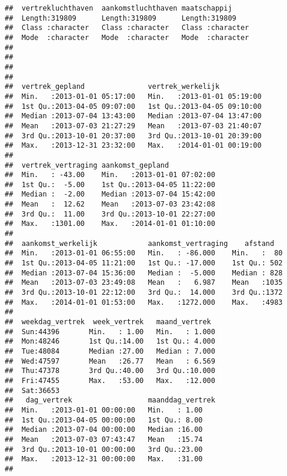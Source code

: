 \documentclass[]{memoir}
\begin{document}
\begin{verbatim}
##  vertrekluchthaven  aankomstluchthaven maatschappij      
##  Length:319809      Length:319809      Length:319809     
##  Class :character   Class :character   Class :character  
##  Mode  :character   Mode  :character   Mode  :character  
##                                                          
##                                                          
##                                                          
##                                                          
##  vertrek_gepland               vertrek_werkelijk            
##  Min.   :2013-01-01 05:17:00   Min.   :2013-01-01 05:19:00  
##  1st Qu.:2013-04-05 09:07:00   1st Qu.:2013-04-05 09:10:00  
##  Median :2013-07-04 13:43:00   Median :2013-07-04 13:47:00  
##  Mean   :2013-07-03 21:27:29   Mean   :2013-07-03 21:40:07  
##  3rd Qu.:2013-10-01 20:37:00   3rd Qu.:2013-10-01 20:39:00  
##  Max.   :2013-12-31 23:32:00   Max.   :2014-01-01 00:19:00  
##                                                             
##  vertrek_vertraging aankomst_gepland             
##  Min.   : -43.00    Min.   :2013-01-01 07:02:00  
##  1st Qu.:  -5.00    1st Qu.:2013-04-05 11:22:00  
##  Median :  -2.00    Median :2013-07-04 15:42:00  
##  Mean   :  12.62    Mean   :2013-07-03 23:42:08  
##  3rd Qu.:  11.00    3rd Qu.:2013-10-01 22:27:00  
##  Max.   :1301.00    Max.   :2014-01-01 01:10:00  
##                                                  
##  aankomst_werkelijk            aankomst_vertraging    afstand    
##  Min.   :2013-01-01 06:55:00   Min.   : -86.000    Min.   :  80  
##  1st Qu.:2013-04-05 11:21:00   1st Qu.: -17.000    1st Qu.: 502  
##  Median :2013-07-04 15:36:00   Median :  -5.000    Median : 828  
##  Mean   :2013-07-03 23:49:08   Mean   :   6.987    Mean   :1035  
##  3rd Qu.:2013-10-01 22:12:00   3rd Qu.:  14.000    3rd Qu.:1372  
##  Max.   :2014-01-01 01:53:00   Max.   :1272.000    Max.   :4983  
##                                                                  
##  weekdag_vertrek  week_vertrek   maand_vertrek   
##  Sun:44396       Min.   : 1.00   Min.   : 1.000  
##  Mon:48246       1st Qu.:14.00   1st Qu.: 4.000  
##  Tue:48084       Median :27.00   Median : 7.000  
##  Wed:47597       Mean   :26.77   Mean   : 6.569  
##  Thu:47378       3rd Qu.:40.00   3rd Qu.:10.000  
##  Fri:47455       Max.   :53.00   Max.   :12.000  
##  Sat:36653                                       
##   dag_vertrek                  maanddag_vertrek
##  Min.   :2013-01-01 00:00:00   Min.   : 1.00   
##  1st Qu.:2013-04-05 00:00:00   1st Qu.: 8.00   
##  Median :2013-07-04 00:00:00   Median :16.00   
##  Mean   :2013-07-03 07:43:47   Mean   :15.74   
##  3rd Qu.:2013-10-01 00:00:00   3rd Qu.:23.00   
##  Max.   :2013-12-31 00:00:00   Max.   :31.00   
## 
\end{verbatim}
\end{document}
